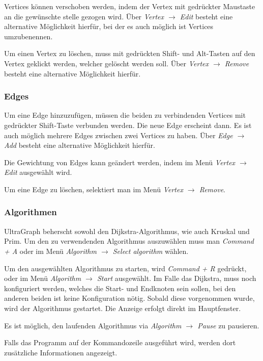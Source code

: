 \documentclass[a4paper,titlepage]{article}
\begin{document}
Vertices können verschoben werden, indem der Vertex mit gedrückter Maustaste an die gewünschte stelle gezogen wird. Über \emph{Vertex $\rightarrow$ Edit} besteht eine alternative Möglichkeit hierfür, bei der es auch möglich ist Vertices umzubenennen.

Um einen Vertex zu löschen, muss mit gedrückten Shift- und Alt-Tasten auf den Vertex geklickt werden, welcher gelöscht werden soll. Über \emph{Vertex $\rightarrow$ Remove} besteht eine alternative Möglichkeit hierfür.

\subsubsection{Edges}

Um eine Edge hinzuzufügen, müssen die beiden zu verbindenden Vertices mit gedrückter Shift-Taste verbunden werden. Die neue Edge erscheint dann. Es ist auch möglich mehrere Edges zwischen zwei Vertices zu haben. Über \emph{Edge $\rightarrow$ Add} besteht eine alternative Möglichkeit hierfür.

Die Gewichtung von Edges kann geändert werden, indem im Menü \emph{Vertex $\rightarrow$ Edit} ausgewählt wird.

Um eine Edge zu löschen, selektiert man im Menü \emph{Vertex $\rightarrow$ Remove}.

\subsubsection{Algorithmen}

UltraGraph beherscht sowohl den Dijkstra-Algorithmus, wie auch Kruskal und Prim. Um den zu verwendenden Algorithmus auszuwählen muss man \emph{Command + A} oder im Menü \emph{Algorithm $\rightarrow$ Select algorithm} wählen.

Um den ausgewählten Algorithmus zu starten, wird \emph{Command + R} gedrückt, oder im Menü \emph{Algorithm $\rightarrow$ Start} ausgewählt. Im Falle das Dijkstra, muss noch konfiguriert werden, welches die Start- und Endknoten sein sollen, bei den anderen beiden ist keine Konfiguration nötig. Sobald diese vorgenommen wurde, wird der Algorithmus gestartet. Die Anzeige erfolgt direkt im Hauptfenster.

Es ist möglich, den laufenden Algorithmus via \emph{Algorithm $\rightarrow$ Pause} zu pausieren.

Falls das Programm auf der Kommandozeile ausgeführt wird, werden dort zusätzliche Informationen angezeigt.
\end{document}
